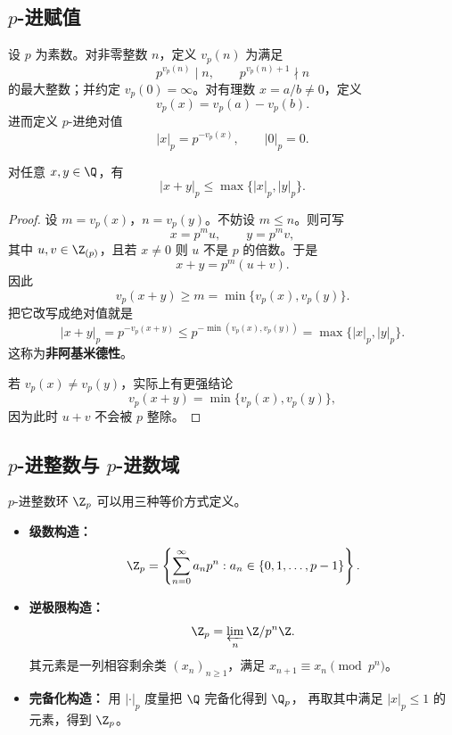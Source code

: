 \subsection{$p$-进赋值}

\begin{definition}[$p$-进赋值]
设 $p$ 为素数。对非零整数 $n$，定义 $v_p(n)$ 为满足
\[
  p^{v_p(n)}\mid n, \qquad p^{v_p(n)+1}\nmid n
\]
的最大整数；并约定 $v_p(0)=\infty$。对有理数 $x=a/b\neq 0$，定义
\begin{equation}
  v_p(x)=v_p(a)-v_p(b).
\end{equation}
进而定义 $p$-进绝对值
\begin{equation}
  |x|_p=p^{-v_p(x)},
  \qquad |0|_p=0.
\end{equation}
\end{definition}

\begin{theorem}[强三角不等式]
对任意 $x,y\in\Q$，有
\begin{equation}
  |x+y|_p\le \max\{|x|_p,|y|_p\}.
\end{equation}
\end{theorem}

\begin{proof}
设 $m=v_p(x)$，$n=v_p(y)$。不妨设 $m\le n$。则可写
\[
  x=p^m u,
  \qquad
  y=p^m v,
\]
其中 $u,v\in\Z_{(p)}$，且若 $x\neq 0$ 则 $u$ 不是 $p$ 的倍数。于是
\[
  x+y=p^m(u+v).
\]
因此
\[
  v_p(x+y)\ge m=\min\{v_p(x),v_p(y)\}.
\]
把它改写成绝对值就是
\[
  |x+y|_p = p^{-v_p(x+y)} \le p^{-\min(v_p(x),v_p(y))}
  =\max\{|x|_p,|y|_p\}.
\]
这称为\textbf{非阿基米德性}。

若 $v_p(x)\neq v_p(y)$，实际上有更强结论
\[
  v_p(x+y)=\min\{v_p(x),v_p(y)\},
\]
因为此时 $u+v$ 不会被 $p$ 整除。
\end{proof}

\subsection{$p$-进整数与 $p$-进数域}

\begin{definition}[三种构造]
$p$-进整数环 $\Z_p$ 可以用三种等价方式定义。
\begin{itemize}
  \item[(1)] \textbf{级数构造：}
  \begin{equation}
    \Z_p=\left\{\sum_{n=0}^{\infty} a_n p^n : a_n\in\{0,1,\dots,p-1\}\right\}.
  \end{equation}
  \item[(2)] \textbf{逆极限构造：}
  \begin{equation}
    \Z_p=\varprojlim_n \Z/p^n\Z.
  \end{equation}
  其元素是一列相容剩余类 $(x_n)_{n\ge 1}$，满足 $x_{n+1}\equiv x_n\pmod{p^n}$。
  \item[(3)] \textbf{完备化构造：} 用 $|\cdot|_p$ 度量把 $\Q$ 完备化得到 $\Q_p$，
  再取其中满足 $|x|_p\le 1$ 的元素，得到 $\Z_p$。
\end{itemize}
\end{definition}

